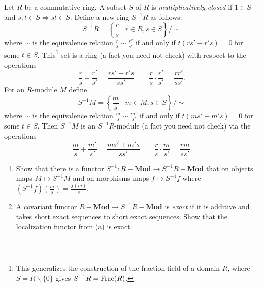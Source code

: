 \documentclass{amsart}[12pt]
\numberwithin{equation}{section}
\theoremstyle{plain} %
\theoremstyle{definition}
\theoremstyle{remark}
\newcommand{\Mod}[1]{#1-\mathbf{Mod}}
\begin{document}
\begin{enumerate}
 Let $R$ be a commutative ring. A subset $S$ of $R$ is \emph{multiplicatively closed} if $1 \in S$ and $s,t \in S \Rightarrow st \in S$. Define a new ring $S^{-1}R$ as follows:
\[S^{-1}R =\left \{\frac{r}{s} \mid  r \in R, s \in S \right \}/\sim\]
where $\sim$ is the equivalence relation  $\frac{r}{s} \sim \frac{r'}{s'}$ if and only if $t(rs' - r's) = 0$ for some $t \in S$.
This\footnote{This generalizes the construction of the fraction field of a domain $R$, where $S=R\smallsetminus \{0\}$ gives $S^{-1}R={\rm Frac}(R)$.} set is a ring (a fact you need not check) with respect to the operations
\[
\frac{r}{s}+\frac{r'}{s'}=\frac{rs'+r's}{ss'} \qquad
\frac{r}{s}\cdot\frac{r'}{s'}=\frac{rr'}{ss'}.
\]
For an $R$-module $M$ define  
\[S^{-1}M =\left \{\frac{m}{s} \mid  m \in M, s \in S \right \}/\sim\]
where $\sim$ is the equivalence relation  $\frac{m}{s} \sim \frac{m'}{s'}$ if and only if $t(ms' - m's) = 0$ for some $t \in S$.
Then $S^{-1}M$ is an $S^{-1}R$-module (a fact you need not check) via the operations
\[
\frac{m}{s}+\frac{m'}{s'}=\frac{ms'+m's}{ss'} \qquad
\frac{r}{s}\cdot\frac{m}{s'}=\frac{rm}{ss'}.
\]
\begin{enumerate}
\item Show that there is a functor $S^{-1}:\Mod{R}\to \Mod{{S^{-1}R}}$ that on objects maps $M\mapsto S^{-1}M$ and on morphisms maps $f\mapsto S^{-1}f$ where $(S^{-1}f)(\frac{m}{s})=\frac{f(m)}{s}$.
\item A covariant functor $\Mod{R} \to \Mod{S^{-1}R}$ is \emph{exact} if it is additive and takes short exact sequences to short exact sequences. Show that the localization functor from (a) is exact.
\end{enumerate}

\



\end{enumerate}
\end{document}
